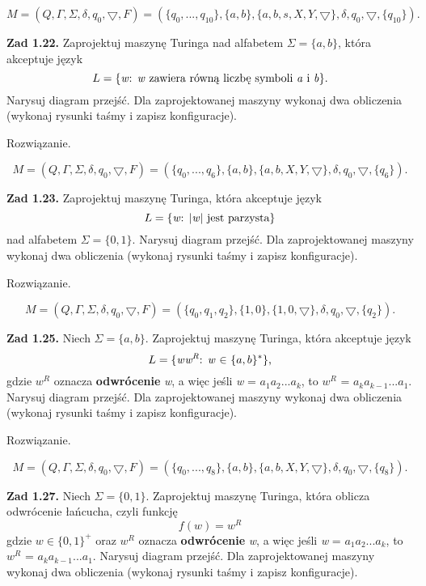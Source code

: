 \documentclass[12pt]{article}
\begin{document}
\[M=(Q,\Gamma,\Sigma,\delta,q_0,\bigtriangledown,F)=(\{q_0,...,q_{10}\},\{a,b\},\{a,b,s,X,Y,\bigtriangledown\},\delta,q_0,\bigtriangledown,\{q_{10}\}).\]

\newpage

\noindent\textbf{Zad 1.22.} Zaprojektuj  maszynę  Turinga  nad  alfabetem $\Sigma=\{a,b\}$,  która akceptuje język
\[L=\{\text{\textit{w}: \textit{w} zawiera  równą liczbę symboli \textit{a} i \textit{b}}\}.\]
Narysuj diagram przejść. Dla zaprojektowanej maszyny wykonaj dwa obliczenia (wykonaj rysunki taśmy i zapisz konfiguracje).

 Rozwiązanie.
 
\[M=(Q,\Gamma,\Sigma,\delta,q_0,\bigtriangledown,F)=(\{q_0,...,q_6\},\{a,b\},\{a,b,X,Y,\bigtriangledown\},\delta,q_0,\bigtriangledown,\{q_6\}).\]

\newpage

\noindent\textbf{Zad 1.23.} Zaprojektuj maszynę Turinga, która akceptuje język
\[L=\{\text{\textit{w}: |\textit{w}| jest parzysta}\}\]
nad alfabetem $\Sigma=\{0,1\}$. Narysuj diagram przejść. Dla zaprojektowanej maszyny wykonaj dwa obliczenia (wykonaj rysunki taśmy i zapisz konfiguracje).

 Rozwiązanie.
 
\[M=(Q,\Gamma,\Sigma,\delta,q_0,\bigtriangledown,F)=(\{q_0,q_1,q_2\},\{1,0\},\{1,0,\bigtriangledown\},\delta,q_0,\bigtriangledown,\{q_2\}).\]

\newpage

\noindent\textbf{Zad 1.25.} Niech $\Sigma=\{a,b\}$. Zaprojektuj maszynę Turinga, która akceptuje język
\[L=\{\text{\textit{w}${\textit{w}^\textit{R}}$: \textit{w} $\in$ $\{a,b\}^*$\},}\]
gdzie ${\textit{w}^\textit{R}}$ oznacza \textbf{odwrócenie} \textit{w},  a  więc  jeśli \textit{w} = $a_1a_2...a_k$, to ${\textit{w}^\textit{R}}$ = $a_ka_{k-1}...a_1$. Narysuj  diagram  przejść. Dla  zaprojektowanej  maszyny  wykonaj dwa obliczenia (wykonaj rysunki taśmy i zapisz konfiguracje).

 Rozwiązanie.
 
\[M=(Q,\Gamma,\Sigma,\delta,q_0,\bigtriangledown,F)=(\{q_0,...,q_8\},\{a,b\},\{a,b,X,Y,\bigtriangledown\},\delta,q_0,\bigtriangledown,\{q_8\}).\]

\newpage

\noindent\textbf{Zad 1.27.} Niech $\Sigma=\{0,1\}$.  Zaprojektuj  maszynę  Turinga,  która  oblicza odwrócenie łańcucha, czyli funkcję
\[f(w)=w^R\]
gdzie $\textit{w}\in\{0,1\}^+$ oraz ${\textit{w}^\textit{R}}$ oznacza \textbf{odwrócenie} \textit{w},  a  więc  jeśli \textit{w} = $a_1a_2...a_k$, to ${\textit{w}^\textit{R}}$ = $a_ka_{k-1}...a_1$. Narysuj  diagram  przejść. Dla  zaprojektowanej  maszyny  wykonaj dwa obliczenia (wykonaj rysunki taśmy i zapisz konfiguracje).
\end{document}
